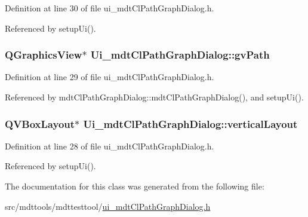 Definition at line 30 of file ui\-\_\-mdt\-Cl\-Path\-Graph\-Dialog.\-h.



Referenced by setup\-Ui().

\hypertarget{class_ui__mdt_cl_path_graph_dialog_a4cb4ddbdeccfb6c65b69f00e967902fd}{
\subsubsection[{gv\-Path}]{\setlength{\rightskip}{0pt plus 5cm}Q\-Graphics\-View$\ast$ Ui\-\_\-mdt\-Cl\-Path\-Graph\-Dialog\-::gv\-Path}}\label{class_ui__mdt_cl_path_graph_dialog_a4cb4ddbdeccfb6c65b69f00e967902fd}


Definition at line 29 of file ui\-\_\-mdt\-Cl\-Path\-Graph\-Dialog.\-h.



Referenced by mdt\-Cl\-Path\-Graph\-Dialog\-::mdt\-Cl\-Path\-Graph\-Dialog(), and setup\-Ui().

\hypertarget{class_ui__mdt_cl_path_graph_dialog_af0f73886c23aeb4094b4d74e19633bc0}{
\subsubsection[{vertical\-Layout}]{\setlength{\rightskip}{0pt plus 5cm}Q\-V\-Box\-Layout$\ast$ Ui\-\_\-mdt\-Cl\-Path\-Graph\-Dialog\-::vertical\-Layout}}\label{class_ui__mdt_cl_path_graph_dialog_af0f73886c23aeb4094b4d74e19633bc0}


Definition at line 28 of file ui\-\_\-mdt\-Cl\-Path\-Graph\-Dialog.\-h.



Referenced by setup\-Ui().



The documentation for this class was generated from the following file\-:\begin{DoxyCompactItemize}
\item 
src/mdttools/mdttesttool/\hyperlink{ui__mdt_cl_path_graph_dialog_8h}{ui\-\_\-mdt\-Cl\-Path\-Graph\-Dialog.\-h}\end{DoxyCompactItemize}
